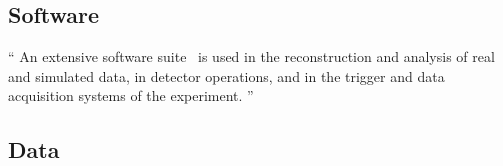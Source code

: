 \subsection{Software}
\label{sec:atlas_software}
\begin{displayquote}
``%
An extensive software suite~\cite{ATL-SOFT-PUB-2021-001} is used in the
reconstruction and analysis of real and simulated data, in detector operations,
and in the trigger and data acquisition systems of the experiment.%
''~\cite{atlas2022searches}
\end{displayquote}


\subsection{Data}
\label{sec:atlas_data}


